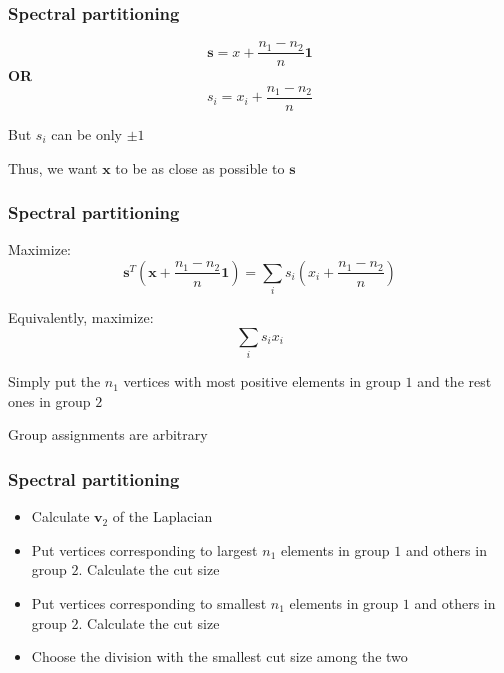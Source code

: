 \documentclass{beamer}
\begin{document}
\begin{frame}
    \frametitle{Spectral partitioning}
    \centering
    $${\mathbf s} = x + \frac{n_1-n_2}{n}{\mathbf 1}$$
    {\bf OR}
    $$s_i = x_i + \frac{n_1-n_2}{n}$$

    \vspace{2em}
    But $s_i$ can be only $\pm 1$

    \vspace{2em}
    Thus, we want ${\mathbf x}$ to be as close as possible to ${\mathbf s}$
\end{frame}
\begin{frame}
    \frametitle{Spectral partitioning}
    Maximize:
    \centering
    $${\mathbf s}^T\left({\mathbf x + \frac{n_1-n_2}{n}{\mathbf 1}}\right) = \sum\limits_is_i\left(x_i + \frac{n_1-n_2}{n}\right)$$

    Equivalently, maximize:
    $$\sum\limits_is_ix_i$$

    Simply put the $n_1$ vertices with most positive elements in group $1$ and the rest ones in group $2$

    \vspace{1em}
    Group assignments are arbitrary
\end{frame}
\begin{frame}
    \frametitle{Spectral partitioning}
    \centering

    \begin{itemize}
        \setlength\itemsep{1em}
        \item{Calculate ${\mathbf v}_2$ of the Laplacian}
        \item{Put vertices corresponding to largest $n_1$ elements in group $1$ and others in group $2$. Calculate the cut size}
        \item{Put vertices corresponding to smallest $n_1$ elements in group $1$ and others in group $2$. Calculate the cut size}
        \item{Choose the division with the smallest cut size among the two}
    \end{itemize}
\end{frame}
\end{document}
